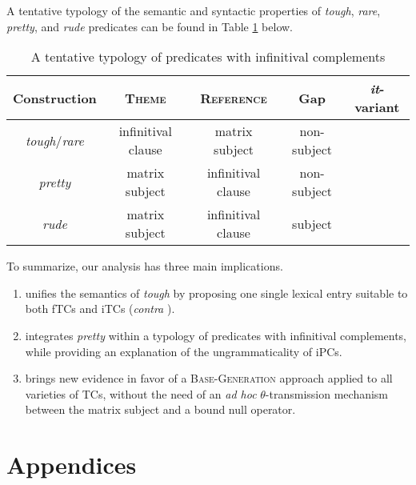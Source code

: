 \documentclass[11pt]{article}
\newcommand{\cmark}{\ding{51}}
\newcommand{\xmark}{\ding{55}}
\begin{document}
	 A tentative typology of the semantic and syntactic properties of \textit{tough}, \textit{rare}, \textit{pretty}, and \textit{rude} predicates can be found in Table \ref{tab:typology} below.
	\begin{table}[H]
		\centering
		\begin{tabular}{|c|c|c|c|c|}
			\hline
			Construction & \textsc{Theme} & \textsc{Reference} & Gap & \textit{it}-variant \\ \hline
			\textit{tough}/\textit{rare} & infinitival clause & matrix subject & non-subject & \cmark \\
			\textit{pretty} & matrix subject & infinitival clause & non-subject & \xmark \\
			\textit{rude} & matrix subject & infinitival clause & subject & \cmark \\ \hline
		\end{tabular}
	\caption{A tentative typology of predicates with infinitival complements}
	\label{tab:typology}
	\end{table}
	
	 To summarize, our analysis has three main implications. 
		\begin{enumerate}
			\item unifies the semantics of \textit{tough} by proposing one single lexical entry suitable to both fTCs and iTCs (\textit{contra} \cite{Keine2017}).
			\item integrates \textit{pretty} within a typology of predicates with infinitival complements, while providing an explanation of the ungrammaticality of iPCs.
			\item brings new evidence in favor of a \textsc{Base-Generation} approach applied to all varieties of TCs, without the need of an \textit{ad hoc} $\theta$-transmission mechanism between the matrix subject and a bound null operator.
		\end{enumerate}

	

	
	
	\iffalse
	Alsop: brave predicates Mary is brave to tell the truth. John was rude to ask Mary about her thesis. Restriction of the judgement to the particular event. Just like pretty. Mary-telling-the-truth cause a brave jusgement about Mary.
	\fi
\newpage


\newpage

\section{Appendices}
\end{document}
